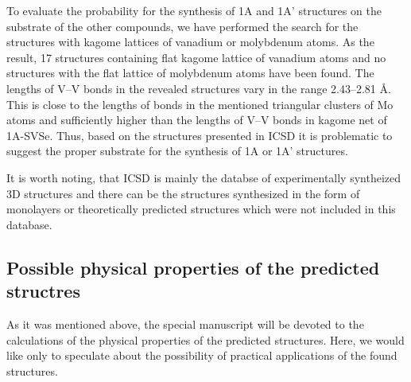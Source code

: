 \documentclass[a4paperm]{article}
\begin{document}
To evaluate the probability for the synthesis of 1A and 1A' structures on the substrate of the other compounds, we have performed the search for the structures with kagome lattices of vanadium or molybdenum atoms.
As the result, 17 structures containing flat kagome lattice of vanadium atoms and no structures with the flat lattice of molybdenum atoms have been found. 
The lengths of V--V bonds in the revealed structures vary in the range 2.43--2.81 \AA.
This is close to the lengths of bonds in the mentioned triangular clusters of Mo atoms and sufficiently higher than the lengths of V--V bonds in kagome net of 1A-SVSe.
Thus, based on the structures presented in ICSD it is problematic to suggest the proper substrate for the synthesis of 1A or 1A' structures.

It is worth noting, that ICSD is mainly the databse of experimentally syntheized 3D structures and there can be the structures synthesized in the form of monolayers or theoretically predicted structures which were not included in this database.



\subsection{Possible physical properties of the predicted structres}

As it was mentioned above, the special manuscript will be devoted to the calculations of the physical properties of the predicted structures.
Here, we would like only to speculate about the possibility of practical applications of the found structures.
\end{document}
